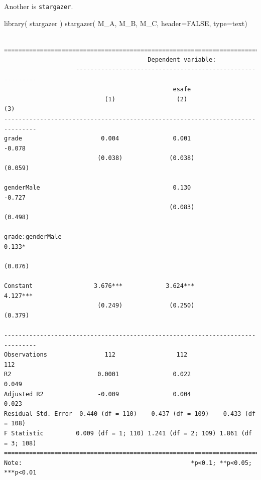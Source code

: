 \documentclass[
  letterpaper,
  DIV=11,
  numbers=noendperiod]{scrreprt}
\newenvironment{Shaded}{}{}
\newcommand{\AttributeTok}[1]{\textcolor[rgb]{0.49,0.56,0.16}{#1}}
\newcommand{\ConstantTok}[1]{\textcolor[rgb]{0.53,0.00,0.00}{#1}}
\newcommand{\FunctionTok}[1]{\textcolor[rgb]{0.02,0.16,0.49}{#1}}
\newcommand{\NormalTok}[1]{#1}
\newcommand{\StringTok}[1]{\textcolor[rgb]{0.25,0.44,0.63}{#1}}
\begin{document}
Another is \texttt{stargazer}.

\begin{Shaded}
\begin{Highlighting}[]
\FunctionTok{library}\NormalTok{( stargazer )}
\FunctionTok{stargazer}\NormalTok{( M\_A, M\_B, M\_C, }\AttributeTok{header=}\ConstantTok{FALSE}\NormalTok{, }\AttributeTok{type=}\StringTok{\textquotesingle{}text\textquotesingle{}}\NormalTok{)}
\end{Highlighting}
\end{Shaded}

\begin{verbatim}

===============================================================================
                                        Dependent variable:                    
                    -----------------------------------------------------------
                                               esafe                           
                            (1)                 (2)                 (3)        
-------------------------------------------------------------------------------
grade                      0.004               0.001              -0.078       
                          (0.038)             (0.038)             (0.059)      
                                                                               
genderMale                                     0.130              -0.727       
                                              (0.083)             (0.498)      
                                                                               
grade:genderMale                                                  0.133*       
                                                                  (0.076)      
                                                                               
Constant                 3.676***            3.624***            4.127***      
                          (0.249)             (0.250)             (0.379)      
                                                                               
-------------------------------------------------------------------------------
Observations                112                 112                 112        
R2                        0.0001               0.022               0.049       
Adjusted R2               -0.009               0.004               0.023       
Residual Std. Error  0.440 (df = 110)    0.437 (df = 109)    0.433 (df = 108)  
F Statistic         0.009 (df = 1; 110) 1.241 (df = 2; 109) 1.861 (df = 3; 108)
===============================================================================
Note:                                               *p<0.1; **p<0.05; ***p<0.01
\end{verbatim}
\end{document}
